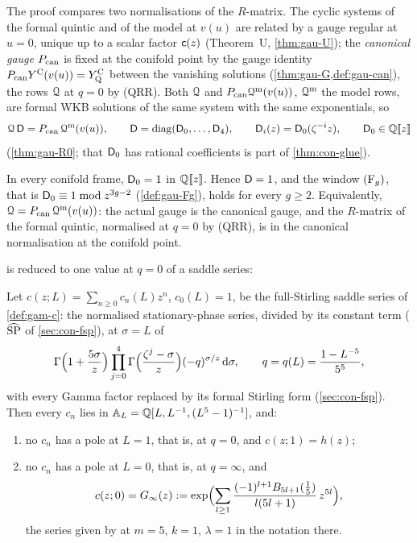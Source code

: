 The proof compares two normalisations of the $R$-matrix. The cyclic systems of the formal quintic and of the model at $v(u)$ are related by a gauge regular at $u=0$, unique up to a scalar factor $\mathsf{c}(z)$ (Theorem~U, \cref{thm:gau-U}); the \emph{canonical gauge} $P_{\mathrm{can}}$ is fixed at the conifold point by the gauge identity $P_{\mathrm{can}}Y^{\mathrm{C}}(v(u))=Y^{\mathrm{C}}_{\mathrm{Q}}$ between the vanishing solutions (\cref{thm:gau-G,def:gau-can}), the rows $\mathcal{Q}$ at $q=0$ by (QRR). Both $\mathcal{Q}$ and $P_{\mathrm{can}}\mathcal{Q}^{\mathrm m}(v(u))$, $\mathcal{Q}^{\mathrm m}$ the model rows, are formal WKB solutions of the same system with the same exponentials, so
\[
\mathcal{Q}\,\mathsf{D}=P_{\mathrm{can}}\,\mathcal{Q}^{\mathrm m}(v(u)),\qquad \mathsf{D}=\operatorname{diag}(\mathsf{D}_0,\dots,\mathsf{D}_4),\qquad \mathsf{D}_i(z)=\mathsf{D}_0(\zeta^{-i}z),\qquad \mathsf{D}_0\in\mathbb{Q}[\![ z ]\!]
\]
(\cref{thm:gau-R0}; that $\mathsf{D}_0$ has rational coefficients is part of \cref{thm:con-glue}).

\begin{thm}
\label{thm:int-D}
In every conifold frame, $\mathsf{D}_0=1$ in $\mathbb{Q}[\![ z ]\!]$. Hence $\mathsf{D}=1$, and the window $(\mathrm{F}_{g})$, that is $\mathsf{D}_0\equiv1\bmod z^{3g-2}$ (\cref{def:gau-Fg}), holds for every $g\geq2$. Equivalently, $\mathcal{Q}=P_{\mathrm{can}}\,\mathcal{Q}^{\mathrm m}(v(u))$: the actual gauge is the canonical gauge, and the $R$-matrix of the formal quintic, normalised at $q=0$ by (QRR), is in the canonical normalisation at the conifold point.
\end{thm}

 is reduced to one value at $q=0$ of a saddle series:

\begin{thm}
\label{thm:int-gamma}
Let $c(z;L)=\sum_{n\geq0}c_n(L)z^n$, $c_0(L)=1$, be the full-Stirling saddle series of \cref{def:gam-c}: the normalised stationary-phase series, divided by its constant term ($\widehat{\mathrm{SP}}$ of \cref{sec:con-fsp}), at $\sigma=L$ of
\[
\Gamma\Bigl(1+\frac{5\sigma}{z}\Bigr)\prod_{j=0}^{4}\Gamma\Bigl(\frac{\zeta^j-\sigma}{z}\Bigr)(-q)^{\sigma/z}\,\mathrm{d}\sigma,\qquad q=q(L)=\frac{1-L^{-5}}{5^5},
\]
with every Gamma factor replaced by its formal Stirling form (\cref{sec:con-fsp}). Then every $c_n$ lies in $\mathbb{A}_{L}=\mathbb{Q}[L,L^{-1},(L^5-1)^{-1}]$, and:
\begin{enumerate}
\item[(a)] no $c_n$ has a pole at $L=1$, that is, at $q=0$, and $c(z;1)=h(z)$;
\item[(b)] no $c_n$ has a pole at $L=0$, that is, at $q=\infty$, and
\[
c(z;0)=G_{\infty}(z):=\exp\Bigl(\sum_{l\geq1}\frac{(-1)^{l+1}B_{5l+1}(\frac15)}{l(5l+1)}\,z^{5l}\Bigr),
\]
the series given by \cite[Lemma~7.7, (37)]{GJR18} at $m=5$, $k=1$, $\lambda=1$ in the notation there.
\end{enumerate}
\end{thm}

